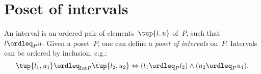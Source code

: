 \section{Poset of intervals}
\begin{definition}
    \label{def:poset_intervals}
    An interval is an ordered pair of elements~$\tup{l,u}$ of~$P$, such that~$l\ordleq_P u$. Given a poset~$P$, one can define a \emph{poset of intervals} on~$P$. Intervals can be ordered by inclusion, e.g.:
    \begin{equation*}
        \tup{l_1,u_1}\ordleq_{\mathrm{Int} P}\tup{l_2,u_2} \Leftrightarrow (l_1\ordleq_P l_2)\wedge (u_2\ordleq_P u_1).
    \end{equation*}
\end{definition}
